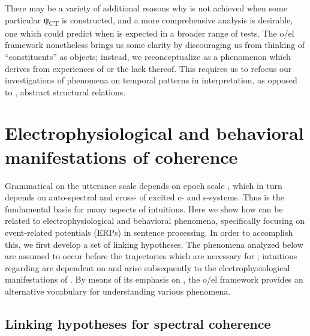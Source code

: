   There may be a variety of additional reasons why  is not achieved when some particular ψ\textsubscript{CT} is constructed, and a more comprehensive analysis is desirable, one which could predict when  is expected in a broader range of  tests. The o/el framework nonetheless brings us some clarity by discouraging us from thinking of “constituents” as objects; instead, we reconceptualize  as a phenomenon which derives from experiences of  or the lack thereof. This requires us to refocus our investigations of  phenomena on temporal patterns in interpretation, as opposed to , abstract structural relations.

\section{Electrophysiological and behavioral manifestations of coherence}

Grammatical  on the utterance scale depends on epoch scale , which in turn depends on auto-spectral and cross- of excited c- and s-sys\-tems. Thus  is the fundamental basis for many aspects of  intuitions. Here we show how  can be related to electrophysiological and behavioral phenomena, specifically focusing on event-related potentials (ERPs) in sentence processing. In order to accomplish this, we first develop a set of linking hypotheses. The  phenomena analyzed below are assumed to occur before the  trajectories which are necessary for ; intuitions regarding  are dependent on and arise subsequently to the electrophysiological manifestations of . By means of its emphasis on , the o/el framework provides an alternative vocabulary for understanding various  phenomena.

\subsection{Linking hypotheses for spectral coherence}

